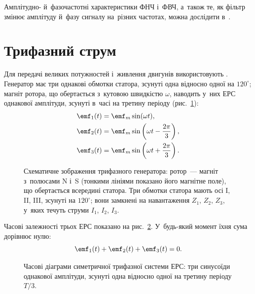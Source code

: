\begin{Simulation}
Амплітудно- й~фазочастотні характеристики ФНЧ і~ФВЧ, а~також те, як фільтр змінює амплітуду
й~фазу сигналу на~різних частотах, можна дослідити в~.
\end{Simulation}


\section{Трифазний струм}\hypertarget{three-phase-current}{}

Для передачі великих потужностей і~живлення двигунів використовують .
Генератор має три однакові обмотки статора, зсунуті одна відносно одної на $120^\circ$; магніт ротора, що обертається
з~кутовою швидкістю $\omega$, наводить у~них ЕРС однакової амплітуди, зсунуті в~часі на третину періоду
(рис.~\ref{pic:ThreePhaseGenerator}):
\begin{align*}
	\emf_1(t) &= \emf_m \sin(\omega t), \notag \\
	\emf_2(t) &= \emf_m \sin\left(\omega t - \frac{2\pi}{3}\right),  \\
	\emf_3(t) &= \emf_m \sin\left(\omega t + \frac{2\pi}{3}\right). \notag
\end{align*}

\begin{figure}[h!]
	\centering
	\caption{Схематичне зображення трифазного генератора: ротор~--- магніт з~полюсами N і~S (тонкими лініями показано його магнітне поле), що обертається всередині статора. Три обмотки статора мають осі I, II, III, зсунуті на $120^\circ$; вони замкнені на навантаження $Z_1$, $Z_2$, $Z_3$, у~яких течуть струми $I_1$, $I_2$, $I_3$.}
	\label{pic:ThreePhaseGenerator}
\end{figure}

Часові залежності трьох ЕРС показано на рис.~\ref{pic:ThreePhaseWaveforms}. У~будь-який момент їхня сума дорівнює нулю:
\begin{equation*}
	\emf_1(t) + \emf_2(t) + \emf_3(t) = 0.
\end{equation*}

\begin{figure}[h!]
	\centering
	\caption{Часові діаграми симетричної трифазної системи ЕРС: три синусоїди однакової амплітуди, зсунуті одна відносно одної на третину періоду $T/3$.}
	\label{pic:ThreePhaseWaveforms}
\end{figure}

